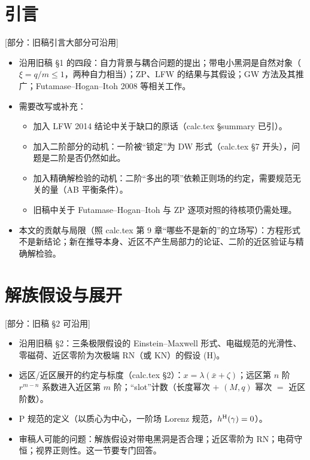 \documentclass[11pt,a4paper]{ctexart}
\newcommand{\status}[1]{\hfill{\small\color{blue!50!black}[#1]}}
\begin{document}
\section{引言}\label{sec:o-intro}
\status{部分：旧稿引言大部分可沿用}
\begin{itemize}[nosep]
\item 沿用旧稿 \S1 的四段：自力背景与耦合问题的提出；带电小黑洞是自然对象（$\xi=q/m\le1$，两种自力相当）；ZP、LFW 的结果与其假设；GW 方法及其推广；Futamase--Hogan--Itoh 2008 等相关工作。
\item 需要改写或补充：
  \begin{itemize}[nosep]
  \item 加入 LFW 2014 结论中关于缺口的原话（calc.tex \S summary 已引）。
  \item 加入二阶部分的动机：一阶被“锁定”为 DW 形式（calc.tex \S7 开头），问题是二阶是否仍然如此。
  \item 加入精确解检验的动机：二阶“多出的项”依赖正则场的约定，需要规范无关的量（AB 平衡条件）。
  \item 旧稿中关于 Futamase--Hogan--Itoh 与 ZP 逐项对照的待核项仍需处理。
  \end{itemize}
\item 本文的贡献与局限（照 calc.tex 第 9 章“哪些不是新的”的立场写）：方程形式不是新结论；新在推导本身、近区不产生局部力的论证、二阶的近区验证与精确解检验。
\end{itemize}

\section{解族假设与展开}\label{sec:o-assump}
\status{部分：旧稿 \S2 可沿用}
\begin{itemize}[nosep]
\item 沿用旧稿 \S2：三条极限假设的 Einstein--Maxwell 形式、电磁规范的光滑性、零磁荷、近区零阶为次极端 RN（或 KN）的假设 (H)。
\item 远区/近区展开的约定与标度（calc.tex \S2）：$x=\lambda(\bar x+\zeta)$；远区第 $n$ 阶 $r^{m-n}$ 系数进入近区第 $m$ 阶；“slot”计数（长度幂次 $+$ $(M,q)$ 幂次 $=$ 近区阶数）。
\item P 规范的定义（以质心为中心，一阶场 Lorenz 规范，$h^{\rm H}(\gamma)=0$）。
\item 审稿人可能的问题：解族假设对带电黑洞是否合理；近区零阶为 RN；电荷守恒；视界正则性。这一节要专门回答。
\end{itemize}
\end{document}
